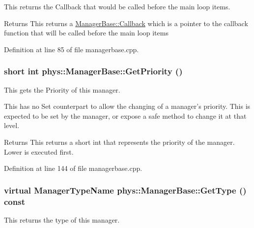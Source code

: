 This returns the Callback that would be called before the main loop items. 

\begin{DoxyReturn}{Returns}
This returns a \hyperlink{classphys_1_1ManagerBase_a753f5f0127131529767beab2502f480b}{ManagerBase::Callback} which is a pointer to the callback function that will be called before the main loop items 
\end{DoxyReturn}


Definition at line 85 of file managerbase.cpp.

\hypertarget{classphys_1_1ManagerBase_af1798db3b808a658bdf14d8914d9b91d}{
\subsubsection[{GetPriority}]{\setlength{\rightskip}{0pt plus 5cm}short int phys::ManagerBase::GetPriority ()}}
\label{d2/de3/classphys_1_1ManagerBase_af1798db3b808a658bdf14d8914d9b91d}


This gets the Priority of this manager. 

This has no Set counterpart to allow the changing of a manager's priority. This is expected to be set by the manager, or expose a safe method to change it at that level. \begin{DoxyReturn}{Returns}
This returns a short int that represents the priority of the manager. Lower is executed first. 
\end{DoxyReturn}


Definition at line 144 of file managerbase.cpp.

\hypertarget{classphys_1_1ManagerBase_aff400b6599db635e24796d8221e9a0e3}{
\subsubsection[{GetType}]{\setlength{\rightskip}{0pt plus 5cm}virtual {\bf ManagerTypeName} phys::ManagerBase::GetType () const}}
\label{d2/de3/classphys_1_1ManagerBase_aff400b6599db635e24796d8221e9a0e3}


This returns the type of this manager. 

